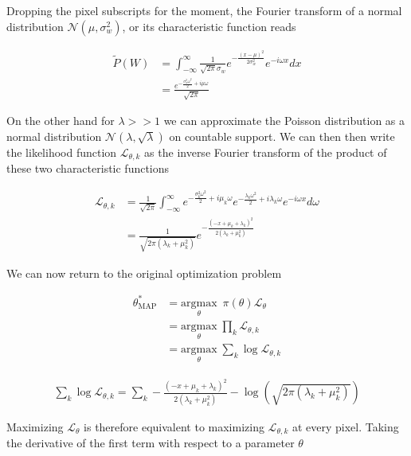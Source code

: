 \documentclass{ucetd}
\begin{document}
Dropping the pixel subscripts for the moment, the Fourier transform of a normal distribution $\mathcal{N}(\mu,\sigma_{w}^{2})$, or its characteristic function reads

\begin{align*}
\tilde{P}(W) &= \int_{-\infty}^{\infty} \frac{1}{\sqrt{2\pi}\sigma_{w}}e^{-\frac{(x-\mu)^{2}}{2\sigma_{w}^{2}}}e^{-i\omega x} dx\\
&= \frac{e^{-\frac{\sigma_{w} ^2 \omega ^2}{2}+i \mu  \omega }}{\sqrt{2 \pi } }
\end{align*}

On the other hand for $\lambda >> 1$ we can approximate the Poisson distribution as a normal distribution $\mathcal{N}(\lambda, \sqrt{\lambda})$ on countable support. We can then then write the likelihood function $\mathcal{L}_{\theta,k}$ as the inverse Fourier transform of the product of these two characteristic functions

\begin{align*}
\mathcal{L}_{\theta,k} &= \frac{1}{\sqrt{2\pi}}\int_{-\infty}^{\infty} e^{-\frac{\sigma_{k} ^2 \omega ^2}{2}+i \mu_{k}  \omega } e^{-\frac{\lambda_{k} \omega ^2}{2}+i \lambda_{k}  \omega }  e^{-i\omega x} d\omega\\
&= \frac{1}{\sqrt{2\pi(\lambda_{k} + \mu_{k}^{2})}}e^{-\frac{(-x+\mu_{k}+\lambda_{k})^{2}}{2(\lambda_{k}+\mu_{k}^{2})}}
\end{align*}

We can now return to the original optimization problem 

\begin{align*}
\theta^{*}_{\mathrm{MAP}} &= \underset{\theta}{\mathrm{argmax}} \;\ \pi(\theta)\mathcal{L}_{\theta}\\
&= \underset{\theta}{\mathrm{argmax}} \; \prod_{k}\mathcal{L}_{\theta,k}\\
&= \underset{\theta}{\mathrm{argmax}} \; \sum_{k}\log \mathcal{L}_{\theta,k}
\end{align*}

\begin{align*}
\sum_{k}\log \mathcal{L}_{\theta,k} = \sum_{k}-\frac{(-x+\mu_{k}+\lambda_{k})^{2}}{2(\lambda_{k}+\mu_{k}^{2})} -\log\left(\sqrt{2\pi(\lambda_{k} + \mu_{k}^{2})}\right)
\end{align*}

Maximizing $\mathcal{L}_{\theta}$ is therefore equivalent to maximizing $\mathcal{L}_{\theta,k}$ at every pixel. Taking the derivative of the first term with respect to a parameter $\theta$
\end{document}
